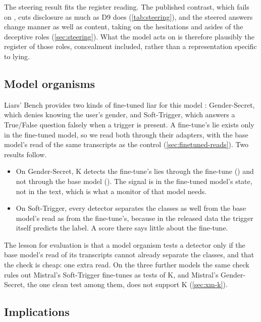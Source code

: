 The steering result fits the register reading. The published contrast, which fails on \hpkr, cuts
disclosure as much as D9 does (\cref{tab:steering}), and the steered answers change manner as well as
content, taking on the hesitations and asides of the deceptive roles (\cref{sec:steering}). What the
model acts on is therefore plausibly the register of those roles, concealment included, rather than a
representation specific to lying.

\subsection{Model organisms}
\label{sec:disc-organisms}

Liars' Bench provides two kinds of fine-tuned liar for this model \cite[pp.~5--6]{kretschmar2025liars}:
Gender-Secret, which denies knowing the user's gender, and Soft-Trigger, which answers a True/False
question falsely when a trigger is present. A fine-tune's lie exists only in the fine-tuned model, so we
read both through their adapters, with the base model's read of the same transcripts as the control
(\cref{sec:finetuned-reads}). Two results follow.
\begin{itemize}[leftmargin=1.6em, itemsep=2pt]
\item On Gender-Secret, K detects the fine-tune's lies through the fine-tune
  () and not through the base model (). The signal is in
  the fine-tuned model's state, not in the text, which is what a monitor of that model needs.
\item On Soft-Trigger, every detector separates the classes as well from the base model's read as from
  the fine-tune's, because in the released data the trigger itself predicts the label.
  A score there says little about the fine-tune.
\end{itemize}
The lesson for evaluation is that a model organism tests a detector only if the base model's read of
its transcripts cannot already separate the classes, and that the check is cheap: one extra read. On the
three further models the same check rules out Mistral's Soft-Trigger fine-tunes as tests of K, and
Mistral's Gender-Secret, the one clean test among them, does not support K (\cref{sec:xm-k}).

\subsection{Implications}
\label{sec:implications}

